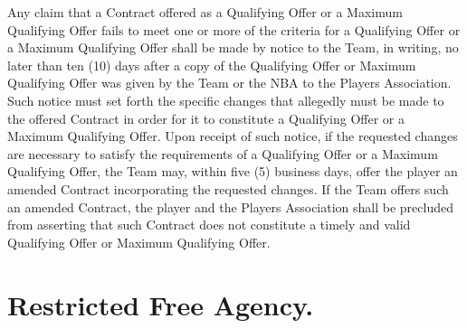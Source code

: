 \documentclass[
]{book}
\begin{document}
\begin{enumerate}
  Any claim that a Contract offered as a Qualifying Offer or a Maximum Qualifying Offer fails to meet one or more of the criteria for a Qualifying Offer or a Maximum Qualifying Offer shall be made by notice to the Team, in writing, no later than ten (10) days after a copy of the Qualifying Offer or Maximum Qualifying Offer was given by the Team or the NBA to the Players Association. Such notice must set forth the specific changes that allegedly must be made to the offered Contract in order for it to constitute a Qualifying Offer or a Maximum Qualifying Offer. Upon receipt of such notice, if the requested changes are necessary to satisfy the requirements of a Qualifying Offer or a Maximum Qualifying Offer, the Team may, within five (5) business days, offer the player an amended Contract incorporating the requested changes. If the Team offers such an amended Contract, the player and the Players Association shall be precluded from asserting that such Contract does not constitute a timely and valid Qualifying Offer or Maximum Qualifying Offer.
\end{enumerate}

\hypertarget{restricted-free-agency.}{%
\section{Restricted Free Agency.}\label{restricted-free-agency.}}
\end{document}
